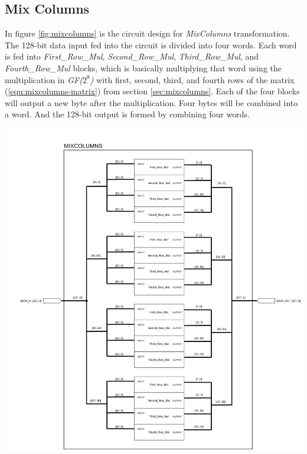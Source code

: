 \documentclass[a4paper, 10pt]{article}
\newenvironment{Figure}
    {\par\medskip\noindent\minipage{\linewidth}}
    {\endminipage\par\medskip}
\begin{document}
\begin{multicols}{2}
            \subsection{Mix Columns}

            In figure \ref{fig:mixcolumns} is the circuit design for \textit{MixColumns} transformation. The 128-bit data input fed into the circuit is divided into four words. Each word is fed into \textit{First\_Row\_Mul}, \textit{Second\_Row\_Mul}, \textit{Third\_Row\_Mul}, and \textit{Fourth\_Row\_Mul} blocks, which is basically multiplying that word using the multiplication in \textit{GF($2^{8}$)} with first, second, third, and fourth rows of the matrix (\ref{equ:mixcolumns-matrix}) from section \ref{sec:mixcolumns}. Each of the four blocks will output a new byte after the multiplication. Four bytes will be combined into a word. And the 128-bit output is formed by combining four words.

            \noindent
            \begin{Figure}
                \centering
                \includegraphics[width=\linewidth]{MixColumns.png}
                \label{fig:mixcolumns}
            \end{Figure}


\end{multicols}
\end{document}
